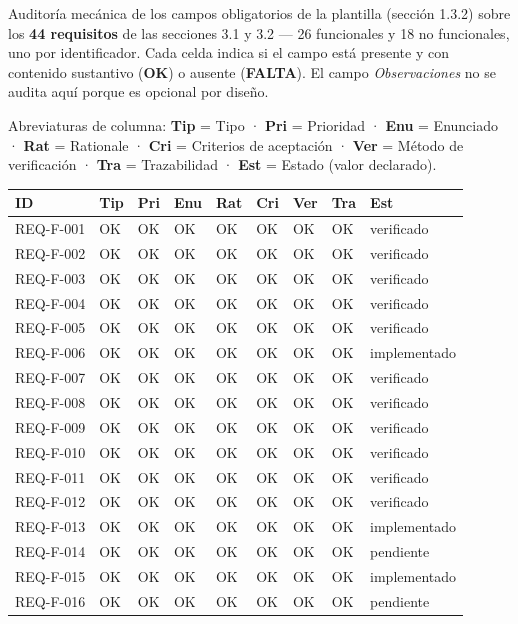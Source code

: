 \documentclass[
  spanish,
]{article}
\newcounter{none} %
\begin{document}
Auditoría mecánica de los campos obligatorios de la plantilla (sección
1.3.2) sobre los \textbf{44 requisitos} de las secciones 3.1 y 3.2 ---
26 funcionales y 18 no funcionales, uno por identificador. Cada celda
indica si el campo está presente y con contenido sustantivo
(\textbf{OK}) o ausente (\textbf{FALTA}). El campo \emph{Observaciones}
no se audita aquí porque es opcional por diseño.

Abreviaturas de columna: \textbf{Tip} = Tipo · \textbf{Pri} = Prioridad
· \textbf{Enu} = Enunciado · \textbf{Rat} = Rationale · \textbf{Cri} =
Criterios de aceptación · \textbf{Ver} = Método de verificación ·
\textbf{Tra} = Trazabilidad · \textbf{Est} = Estado (valor declarado).

{\def\LTcaptype{none} %
\begin{longtable}[]{@{}lllllllll@{}}
\toprule\noalign{}
ID & Tip & Pri & Enu & Rat & Cri & Ver & Tra & Est \\
\midrule\noalign{}
\endhead
\bottomrule\noalign{}
\endlastfoot
REQ-F-001 & OK & OK & OK & OK & OK & OK & OK & verificado \\
REQ-F-002 & OK & OK & OK & OK & OK & OK & OK & verificado \\
REQ-F-003 & OK & OK & OK & OK & OK & OK & OK & verificado \\
REQ-F-004 & OK & OK & OK & OK & OK & OK & OK & verificado \\
REQ-F-005 & OK & OK & OK & OK & OK & OK & OK & verificado \\
REQ-F-006 & OK & OK & OK & OK & OK & OK & OK & implementado \\
REQ-F-007 & OK & OK & OK & OK & OK & OK & OK & verificado \\
REQ-F-008 & OK & OK & OK & OK & OK & OK & OK & verificado \\
REQ-F-009 & OK & OK & OK & OK & OK & OK & OK & verificado \\
REQ-F-010 & OK & OK & OK & OK & OK & OK & OK & verificado \\
REQ-F-011 & OK & OK & OK & OK & OK & OK & OK & verificado \\
REQ-F-012 & OK & OK & OK & OK & OK & OK & OK & verificado \\
REQ-F-013 & OK & OK & OK & OK & OK & OK & OK & implementado \\
REQ-F-014 & OK & OK & OK & OK & OK & OK & OK & pendiente \\
REQ-F-015 & OK & OK & OK & OK & OK & OK & OK & implementado \\
REQ-F-016 & OK & OK & OK & OK & OK & OK & OK & pendiente \\

\end{longtable}}
\end{document}
